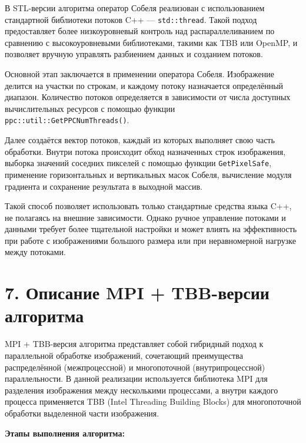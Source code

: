 \documentclass{report}
\begin{document}
В STL-версии алгоритма оператор Собеля реализован с использованием стандартной библиотеки потоков C++ — \texttt{std::thread}. Такой подход предоставляет более низкоуровневый контроль над распараллеливанием по сравнению с высокоуровневыми библиотеками, такими как TBB или OpenMP, и позволяет вручную управлять разбиением данных и созданием потоков.

Основной этап заключается в применении оператора Собеля. Изображение делится на участки по строкам, и каждому потоку назначается определённый диапазон. Количество потоков определяется в зависимости от числа доступных вычислительных ресурсов с помощью функции \texttt{ppc::util::GetPPCNumThreads()}.

Далее создаётся вектор потоков, каждый из которых выполняет свою часть обработки. Внутри потока происходит обход назначенных строк изображения, выборка значений соседних пикселей с помощью функции \texttt{GetPixelSafe}, применение горизонтальных и вертикальных масок Собеля, вычисление модуля градиента и сохранение результата в выходной массив.

Такой способ позволяет использовать только стандартные средства языка C++, не полагаясь на внешние зависимости. Однако ручное управление потоками и данными требует более тщательной настройки и может влиять на эффективность при работе с изображениями большого размера или при неравномерной нагрузке между потоками.


\newpage
\section*{7. Описание MPI + TBB-версии алгоритма}
\justifying

MPI + TBB-версия алгоритма представляет собой гибридный подход к параллельной обработке изображений, сочетающий преимущества распределённой (межпроцессной) и многопоточной (внутрипроцессной) параллельности. В данной реализации используется библиотека MPI для разделения изображения между несколькими процессами, а внутри каждого процесса применяется TBB (Intel Threading Building Blocks) для многопоточной обработки выделенной части изображения.

\textbf{Этапы выполнения алгоритма:}
\end{document}
